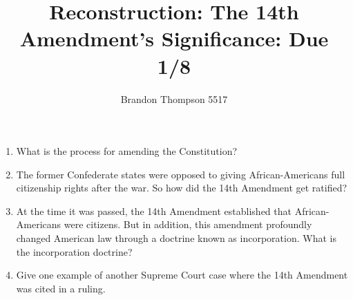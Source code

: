 \documentclass[a4paper]{article}
\begin{document}
	\title{Reconstruction: The 14th Amendment's Significance: Due 1/8}
	\author{Brandon Thompson 5517}
	\maketitle

	\begin{enumerate}
		\item What is the process for amending the Constitution?

		\item The former Confederate states were opposed to giving African-Americans
			full citizenship rights after the war. So how did the 14th Amendment
			get ratified?
		\item At the time it was passed, the 14th Amendment established that African-Americans
			were citizens. But in addition, this amendment profoundly changed American law
			through a doctrine known as incorporation. What is the incorporation doctrine?
		\item Give one example of another Supreme Court case where the 14th Amendment was
			cited in a ruling.
	\end{enumerate}	
\end{document}
